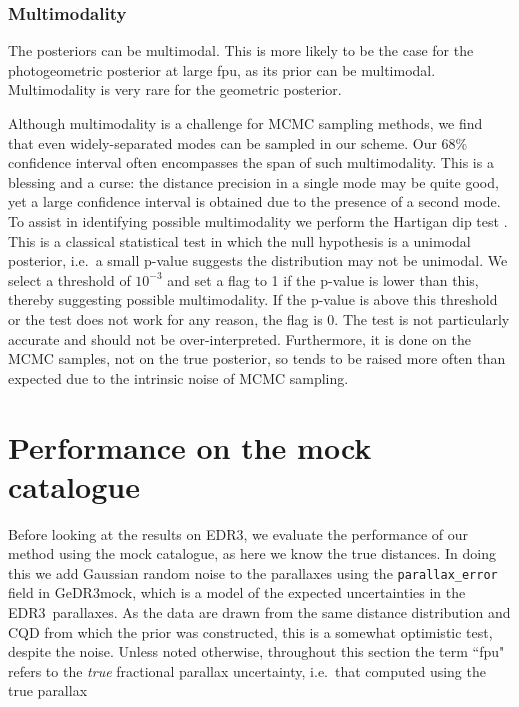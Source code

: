 \documentclass[twocolumn]{aastex62}
\providecommand{\mock}{GeDR3mock}
\providecommand{\release}{EDR3}
\begin{document}

\subsubsection{Multimodality}\label{sec:multimodality}

The posteriors can be multimodal.
This is more likely to be the case for the photogeometric posterior at large fpu, as its prior can be multimodal. Multimodality is very rare for the geometric posterior.

Although multimodality is a challenge for MCMC sampling methods, we find that even widely-separated modes can be sampled in our scheme. Our 68\% confidence interval often encompasses the span of such multimodality. This is a blessing and a curse: the distance precision in a single mode may be quite good, yet a large confidence interval is obtained due to the presence of a second mode.
To assist in identifying possible multimodality we perform the Hartigan dip test \citep{hartigan1985}. This is a classical statistical test in which the null hypothesis is a unimodal posterior, i.e.\ a small p-value suggests the distribution may not be unimodal. We select a threshold of $10^{-3}$ and set a flag to 1 if the p-value is lower than this, thereby suggesting possible multimodality.
If the p-value is above this threshold or the test does not work for any reason, the flag is 0.
The test is not particularly accurate and should not be over-interpreted.
Furthermore, it is done on the MCMC samples, not on the true posterior, so tends to be raised more often than expected due to the intrinsic noise of MCMC sampling.



\vspace*{1em}
\section{Performance on the mock catalogue}\label{sec:results_mock}

Before looking at the results on \release, we evaluate the performance of our method using the mock catalogue, as here we know the true distances. In doing this we add Gaussian random noise to the parallaxes using the {\tt parallax\_error} field in \mock, which is a model of the expected uncertainties in the \release\ parallaxes.  
As the data are drawn from the same distance distribution and CQD from which the prior was constructed, this is a somewhat optimistic test, despite the noise.
Unless noted otherwise, throughout this section the term ``fpu" refers to the {\em true} fractional parallax uncertainty, i.e.\ that computed using the true parallax
\end{document}
